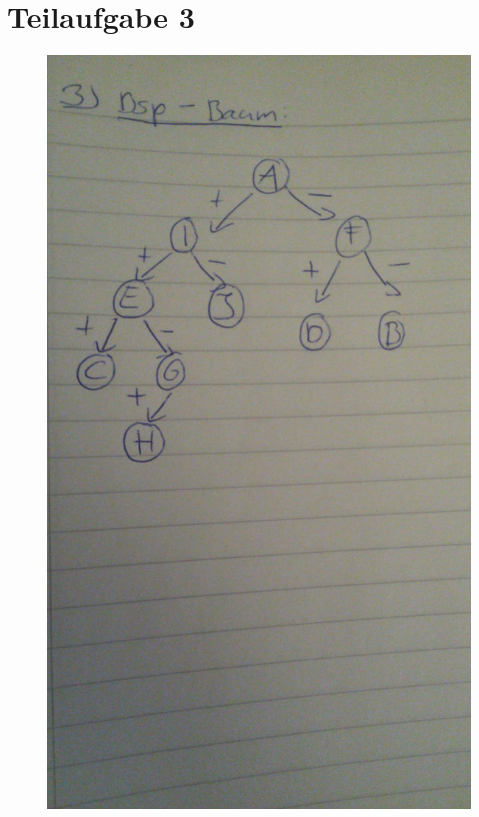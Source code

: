 \documentclass[10pt,a4paper]{article}
\begin{document}
\section*{Teilaufgabe 3}
\begin{figure}
	\centering 
	\includegraphics[width=1\textwidth]{A3.jpeg}
\end{figure}
\end{document}
